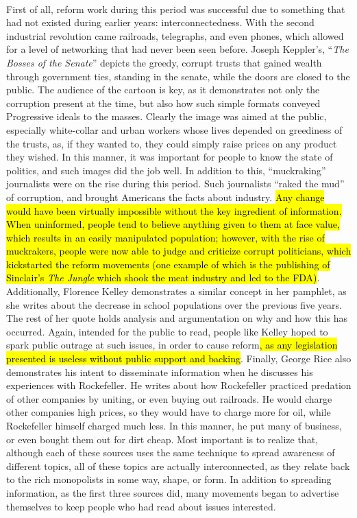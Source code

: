 \documentclass[12pt]{article}
\begin{document}
\paragraph{} First of all, reform work during this period was successful due to something that had not existed during earlier years: interconnectedness. With the second industrial revolution came railroads, telegraphs, and even phones, which allowed for a level of networking that had never been seen before. Joseph Keppler's, ``\textit{The Bosses of the Senate}'' depicts the greedy, corrupt trusts that gained wealth through government ties, standing in the senate, while the doors are closed to the public. The audience of the cartoon is key, as it demonstrates not only the corruption present at the time, but also how such simple formats conveyed Progressive ideals to the masses. Clearly the image was aimed at the public, especially white-collar and urban workers whose lives depended on greediness of the trusts, as, if they wanted to, they could simply raise prices on any product they wished. In this manner, it was important for people to know the state of politics, and such images did the job well. In addition to this, ``muckraking'' journalists were on the rise during this period. Such journalists ``raked the mud'' of corruption, and brought Americans the facts about industry. \hl{Any change would have been virtually impossible without the key ingredient of information. When uninformed, people tend to believe anything given to them at face value, which results in an easily manipulated population; however, with the rise of muckrakers, people were now able to judge and criticize corrupt politicians, which kickstarted the reform movements (one example of which is the publishing of Sinclair's \textit{The Jungle} which shook the meat industry and led to the FDA)}.  Additionally, Florence Kelley demonstrates a similar concept in her pamphlet, as she writes about the decrease in school populations over the previous five years. The rest of her quote holds analysis and argumentation on why and how this has occurred. Again, intended for the public to read, people like Kelley hoped to spark public outrage at such issues, in order to cause reform\hl{, as any legislation presented is useless without public support and backing}. Finally, George Rice also demonstrates his intent to disseminate information when he discusses his experiences with Rockefeller. He writes about how Rockefeller practiced predation of other companies by uniting, or even buying out railroads. He would charge other companies high prices, so they would have to charge more for oil, while Rockefeller himself charged much less. In this manner, he put many of business, or even bought them out for dirt cheap. Most important is to realize that, although each of these sources uses the same technique to spread awareness of different topics, all of these topics are actually interconnected, as they relate back to the rich monopolists in some way, shape, or form. In addition to spreading information, as the first three sources did, many movements began to advertise themselves to keep people who had read about issues interested.
\end{document}
